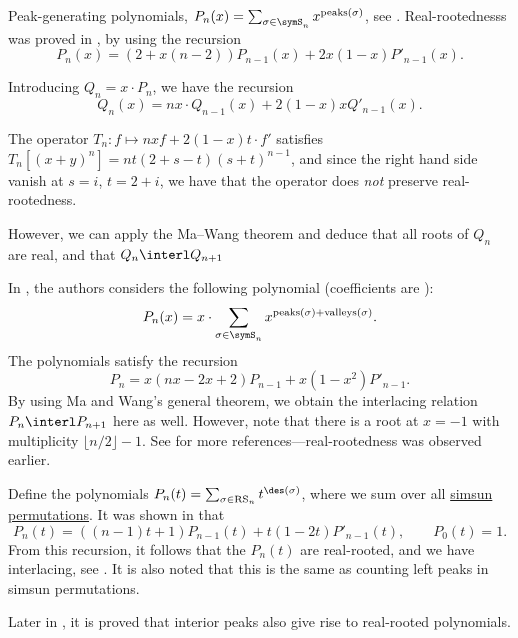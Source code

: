 \begin{example*}

Peak-generating polynomials, $P_n(x) = \sum_{\sigma \in \symS_n} x^{\text{peaks}(\sigma)}$, see .
Real-rootednesss was proved in \cite{WarrenSeneta1996}, by using the recursion
\begin{equation}
 P_n(x) = (2+x(n-2)) P_{n-1}(x) + 2x(1-x) P'_{n-1}(x).
\end{equation}

Introducing $Q_n = x\cdot P_n$, we have the recursion
\begin{equation}
 Q_n(x) = n x\cdot  Q_{n-1}(x) + 2(1-x)x Q'_{n-1}(x).
\end{equation}

The operator $T_n:f \mapsto nx f + 2(1-x)t \cdot f'$
satisfies $T_n[(x+y)^n] = n t (2+s-t)(s+t)^{n-1}$,
and since the right hand side vanish at $s=i$, $t = 2+i$,
we have that the operator does \emph{not} preserve real-rootedness.

However, we can apply the Ma--Wang theorem \cite{MaWang2008}
and deduce that all roots of $Q_n$ are real, and that  $Q_n \interl Q_{n+1}$
\end{example*}


\begin{example*}
In \cite{MaWang2008}, the authors considers the following polynomial (coefficients are ):
\[
  P_n(x) = x \cdot \sum_{\sigma \in \symS_n} x^{\text{peaks}(\sigma)+\text{valleys}(\sigma)}.
\]
The polynomials satisfy the recursion
\[
P_n = x(nx-2x+2)P_{n-1} + x(1-x^2) P'_{n-1}.
\]
By using Ma and Wang's general theorem, we obtain the
interlacing relation $P_n \interl P_{n+1}$ here as well.
However, note that there is a root at $x=-1$ with multiplicity $\lfloor n/2 \rfloor -1$.
See \cite{MaWang2008} for more references---real-rootedness was observed earlier.
\end{example*}

\begin{example*}
Define the polynomials $P_n(t) = \sum_{\sigma \in \mathrm{RS}_n} t^{\des(\sigma)}$,
where we sum over all \hyperref[namedPermutationSets]{simsun permutations}.
It was shown in \cite{ChowShiu2011} that
\begin{equation}
 P_n(t) = ((n-1)t + 1) P_{n-1}(t) + t(1-2t) P'_{n-1}(t), \qquad P_0(t)=1.
\end{equation}
From this recursion, it follows that the $P_n(t)$ are real-rooted, and we have interlacing, see
\cite[Thm. 2.1 (iii)]{ChowShiu2011}.
It is also noted that this is the same as counting left peaks in simsun permutations.

Later in \cite{MaYeh2016}, it is proved that interior peaks also give rise
to real-rooted polynomials.
\end{example*}




